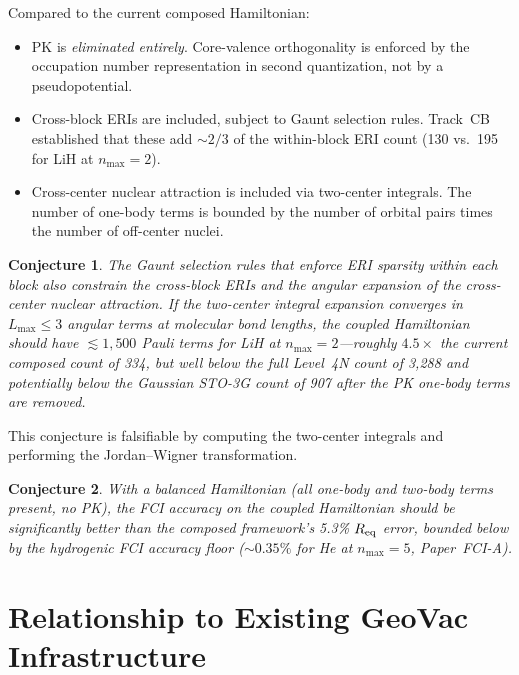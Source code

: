 \documentclass[aps,pra,twocolumn,superscriptaddress,longbibliography]{revtex4-2}
\newtheorem{conjecture}{Conjecture}
\begin{document}
Compared to the current composed Hamiltonian:
\begin{itemize}
\item PK is \emph{eliminated entirely}.  Core-valence orthogonality is
  enforced by the occupation number representation in second
  quantization, not by a pseudopotential.
\item Cross-block ERIs are included, subject to Gaunt selection rules.
  Track~CB established that these add ${\sim}2/3$ of the within-block
  ERI count (130 vs.~195 for LiH at $n_{\max} = 2$).
\item Cross-center nuclear attraction is included via two-center
  integrals.  The number of one-body terms is bounded by the number
  of orbital pairs times the number of off-center nuclei.
\end{itemize}

\begin{conjecture}
\label{conj:sparsity}
The Gaunt selection rules that enforce ERI sparsity within each block
also constrain the cross-block ERIs and the angular expansion of the
cross-center nuclear attraction.  If the two-center integral expansion
converges in $L_{\max} \le 3$ angular terms at molecular bond lengths,
the coupled Hamiltonian should have $\lesssim 1{,}500$ Pauli terms for
LiH at $n_{\max} = 2$---roughly $4.5\times$ the current composed
count of 334, but well below the full Level~4N count of 3{,}288 and
potentially below the Gaussian STO-3G count of 907 after the PK
one-body terms are removed.
\end{conjecture}

This conjecture is falsifiable by computing the two-center integrals
and performing the Jordan--Wigner transformation.

\begin{conjecture}
\label{conj:accuracy}
With a balanced Hamiltonian (all one-body and two-body terms present,
no PK), the FCI accuracy on the coupled Hamiltonian should be
significantly better than the composed framework's 5.3\% $R_{\rm eq}$
error, bounded below by the hydrogenic FCI accuracy floor
(${\sim}0.35\%$ for He at $n_{\max} = 5$, Paper~FCI-A).
\end{conjecture}


\section{Relationship to Existing GeoVac Infrastructure}
\label{sec:infrastructure}
\end{document}
